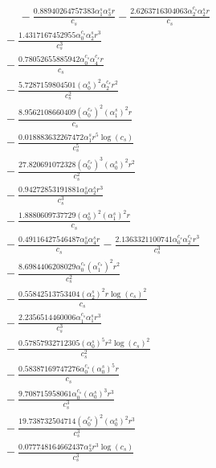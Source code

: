 \documentclass[10pt]{article}
\begin{document}
\begin{align*}
\phantom{R_{2,7}} &\phantom{={}}{}  - \frac{0.88940264757383 \alpha_{1}^s \alpha_{3}^s r}{c_{s}} - \frac{2.6263716304063 \alpha_{2}^{c_s} \alpha_{2}^s r}{c_{s}} \\
&{}  - \frac{1.4317167452955 \alpha_{0}^{c_s} \alpha_{2}^s r^{3}}{c_{s}^{3}} \\
&{}  - \frac{0.78052655885942 \alpha_{0}^{c_s} \alpha_{4}^{c_s} r}{c_{s}} \\
&{}  - \frac{5.7287159804501 \left(\alpha_{0}^s\right)^{2} \alpha_{2}^{c_s} r^{2}}{c_{s}^{2}} \\
&{}  - \frac{8.9562108660409 \left(\alpha_{0}^{c_s}\right)^{2} \left(\alpha_{1}^s\right)^{2} r}{c_{s}} \\
&{}  - \frac{0.018883632267472 \alpha_{1}^s r^{5} \log{\left(c_{s} \right)}}{c_{s}^{5}} \\
&{}  - \frac{27.820691072328 \left(\alpha_{0}^{c_s}\right)^{3} \left(\alpha_{0}^s\right)^{2} r^{2}}{c_{s}^{2}} \\
&{}  - \frac{0.94272853191881 \alpha_{0}^s \alpha_{2}^s r^{3}}{c_{s}^{3}} \\
&{}  - \frac{1.8880609737729 \left(\alpha_{0}^s\right)^{2} \left(\alpha_{1}^s\right)^{2} r}{c_{s}} \\
&{}  - \frac{0.49116427546487 \alpha_{0}^s \alpha_{4}^s r}{c_{s}} - \frac{2.1363321100741 \alpha_{0}^{c_s} \alpha_{2}^{c_s} r^{3}}{c_{s}^{3}} \\
&{}  - \frac{8.6984406208029 \alpha_{0}^{c_s} \left(\alpha_{1}^{c_s}\right)^{2} r^{2}}{c_{s}^{2}} \\
&{}  - \frac{0.55842513753404 \left(\alpha_{2}^s\right)^{2} r \log{\left(c_{s} \right)}^{2}}{c_{s}} \\
&{}  - \frac{2.2356514460006 \alpha_{1}^{c_s} \alpha_{1}^s r^{3}}{c_{s}^{3}} \\
&{}  - \frac{0.57857932712305 \left(\alpha_{0}^s\right)^{5} r^{2} \log{\left(c_{s} \right)}^{2}}{c_{s}^{2}} \\
&{}  - \frac{0.58387169747276 \alpha_{0}^{c_s} \left(\alpha_{0}^s\right)^{5} r}{c_{s}} \\
&{}  - \frac{9.708715958061 \alpha_{0}^{c_s} \left(\alpha_{0}^s\right)^{3} r^{3}}{c_{s}^{3}} \\
&{}  - \frac{19.738732504714 \left(\alpha_{0}^{c_s}\right)^{2} \left(\alpha_{0}^s\right)^{2} r^{3}}{c_{s}^{3}} \\
&{}  - \frac{0.077748164662437 \alpha_{3}^s r^{3} \log{\left(c_{s} \right)}}{c_{s}^{3}} \\

\end{align*}
\end{document}
